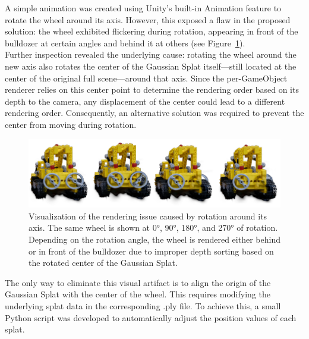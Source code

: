 \documentclass[12pt]{article}
\begin{document}
\FloatBarrier
\noindent
A simple animation was created using Unity’s built-in Animation feature to rotate the wheel around its axis. However, this exposed a flaw in the proposed solution: the wheel exhibited flickering during rotation, appearing in front of the bulldozer at certain angles and behind it at others (see Figure~\ref{fig:wheel_rotations}).
\\
Further inspection revealed the underlying cause: rotating the wheel around the new axis also rotates the center of the Gaussian Splat itself—still located at the center of the original full scene—around that axis. Since the per-GameObject renderer relies on this center point to determine the rendering order based on its depth to the camera, any displacement of the center could lead to a different rendering order. Consequently, an alternative solution was required to prevent the center from moving during rotation.
\begin{figure}[h!]
	\centering
	\includegraphics[width=\textwidth]{Images/wheel_rotations.png}
	\caption{Visualization of the rendering issue caused by rotation around its axis. The same wheel is shown at 0°, 90°, 180°, and 270° of rotation. Depending on the rotation angle, the wheel is rendered either behind or in front of the bulldozer due to improper depth sorting based on the rotated center of the Gaussian Splat.}
	\label{fig:wheel_rotations}
\end{figure}
\FloatBarrier
\noindent
The only way to eliminate this visual artifact is to align the origin of the Gaussian Splat with the center of the wheel. This requires modifying the underlying splat data in the corresponding .ply file. To achieve this, a small Python script was developed to automatically adjust the position values of each splat.
\\
\end{document}
